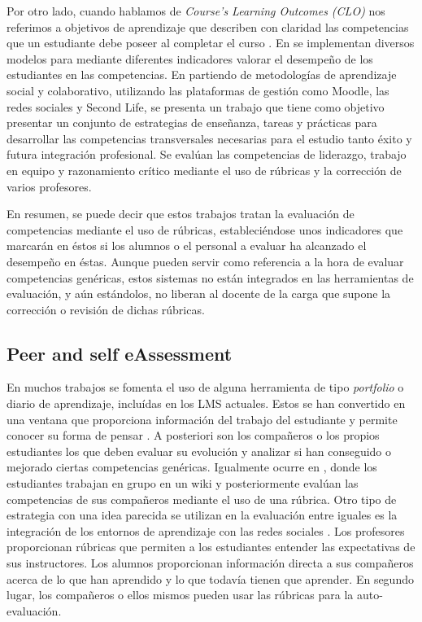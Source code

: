 Por otro lado, cuando hablamos de \emph{Course’s Learning Outcomes (CLO)} nos referimos a objetivos de aprendizaje que describen con claridad las competencias que un estudiante debe poseer al completar el curso \cite{SimonTaylor:2009, Anderson:2001,Kennedy:2007}. En \cite {Mohamed:2008,Mohamed:2008a,Rashid:2008} se implementan diversos modelos para mediante diferentes indicadores valorar el desempeño de los estudiantes en las competencias. En \cite{MercedesRico:2013} partiendo de metodologías de aprendizaje social y colaborativo, utilizando las plataformas de gestión como Moodle, las redes sociales y Second Life, se presenta un trabajo que tiene como objetivo presentar un conjunto de estrategias de enseñanza, tareas y prácticas para desarrollar las competencias transversales necesarias para el estudio tanto éxito y futura integración profesional. Se evalúan las competencias de liderazgo, trabajo en equipo y razonamiento crítico mediante el uso de rúbricas y la corrección de varios profesores.

En resumen, se puede decir que estos trabajos tratan la evaluación de competencias mediante el uso de rúbricas, estableciéndose unos indicadores que marcarán en éstos si los alumnos o el personal a evaluar ha alcanzado el desempeño en éstas. Aunque pueden servir como referencia a la hora de evaluar competencias genéricas, estos sistemas no están integrados en las herramientas de evaluación, y aún estándolos, no liberan al docente de la carga que supone la corrección o revisión de dichas rúbricas.

\subsection{Peer and self eAssessment}

En muchos trabajos se fomenta el uso de alguna herramienta de tipo \emph{portfolio} o diario de aprendizaje, incluídas en los LMS actuales. Estos se han convertido en una ventana que proporciona información del trabajo del estudiante y permite conocer su forma de pensar \cite{Palomares:2011,Gil:2011}. A posteriori son los compañeros o los propios estudiantes los que deben evaluar su evolución y analizar si han conseguido o mejorado ciertas competencias genéricas. Igualmente ocurre en \cite{Lim:2011}, donde los estudiantes trabajan en grupo en un wiki y posteriormente evalúan las competencias de sus compañeros mediante el uso de una rúbrica. Otro tipo de estrategia con una idea parecida se utilizan en la evaluación entre iguales es la integración de los entornos de aprendizaje con las redes sociales \cite{Piedra:2010,McLoughlin:2006,Shih:2011}. Los profesores proporcionan rúbricas que permiten a los estudiantes entender las expectativas de sus instructores. Los alumnos proporcionan información directa a sus compañeros acerca de lo que han aprendido y lo que todavía tienen que aprender. En segundo lugar, los compañeros o ellos mismos pueden usar las rúbricas para la auto-evaluación. 

